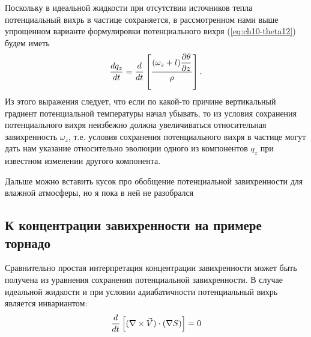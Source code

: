 Поскольку в идеальной жидкости при отсутствии источников тепла потенциальный вихрь в частице сохраняется, в рассмотренном нами выше упрощенном варианте формулировки потенциального вихря (\ref{eq:ch10-theta12}) будем иметь
\begin{equation}
    \label{eq:ch10-theta13}
    \displaystyle\frac{d q_z}{d t} = \displaystyle\frac{d }{d t} \displaystyle \left[  \frac{(\omega_z+l)\displaystyle\frac{\partial \theta}{\partial z} }{\rho}  \right].
\end{equation}
Из этого выражения следует, что если по какой-то причине вертикальный градиент потенциальной температуры начал убывать, то из условия сохранения потенциального вихря неизбежно должна увеличиваться относительная завихренность $\omega_z$, т.е. условия сохранения потенциального вихря в частице могут дать нам указание относительно эволюции одного из компонентов $q_z$ при известном изменении другого компонента.

\begin{warn}
    Дальше можно вставить кусок про обобщение потенциальной завихренности для влажной атмосферы, но я пока в ней не разобрался
\end{warn}

\subsection{{\color{done}К концентрации завихренности на примере торнадо}}
Сравнительно простая интерпретация концентрации завихренности может быть получена из уравнения сохранения потенциальной завихренности. В случае идеальной жидкости и при условии адиабатичности потенциальный вихрь является инвариантом:
\begin{equation}
    \label{eq:ch10-pv1}
    \displaystyle\frac{d }{d t} \displaystyle \left[  (\nabla\times\vec{V})\cdot(\nabla S)  \right] = 0
\end{equation}

